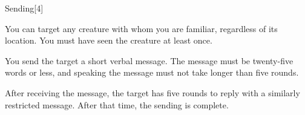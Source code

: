 \begin{spellsection}{Sending}[4]
    \begin{spellheader}
    \end{spellheader}
    \begin{spellcontent}
        \begin{spelltargetinginfo}
            \spellspecial You can target any creature with whom you are familiar, regardless of its location. You must have seen the creature at least once.
        \end{spelltargetinginfo}
        \begin{spelleffects}
            \spelleffect You send the target a short verbal message. The message must be twenty-five words or less, and speaking the message must not take longer than five rounds.

            After receiving the message, the target has five rounds to reply with a similarly restricted message. After that time, the sending is complete.
        \end{spelleffects}
    \end{spellcontent}
    \begin{spellfooter}
    \end{spellfooter}
    \begin{spellaugments}
    \end{spellaugments}
\end{spellsection}

